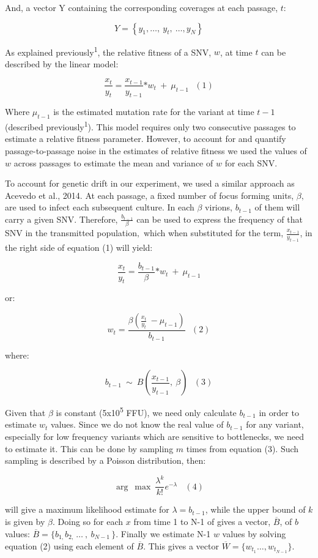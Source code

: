 \documentclass[
]{article}
\begin{document}
And, a vector Y containing the corresponding coverages at each passage,
\(t\):

\[Y = \left\{ y_{1},\ldots,\ y_{t},\ \ldots,y_{N} \right\}\]

As explained previously\textsuperscript{1}, the relative fitness of a
SNV, \(w\), at time \(t\) can be described by the linear model:

\[\frac{x_{t}}{y_{t}} = \frac{x_{t - 1}}{y_{t - 1}}{*w}_{t}\  + \ \mu_{t - 1}\ \ \ (1)\]

Where \(\mu_{t - 1}\) is the estimated mutation rate for the variant at
time \(t - 1\) (described previously\textsuperscript{1}). This model
requires only two consecutive passages to estimate a relative fitness
parameter. However, to account for and quantify passage-to-passage noise
in the estimates of relative fitness we used the values of \(w\) across
passages to estimate the mean and variance of \(w\) for each SNV.

To account for genetic drift in our experiment, we used a similar
approach as Acevedo et al., 2014. At each passage, a fixed number of
focus forming units, \(\beta,\) are used to infect each subsequent
culture. In each \(\beta\) virions, \(b_{t - 1}\) of them will carry a
given SNV. Therefore, \(\frac{b_{t - 1}}{\beta}\) can be used to express
the frequency of that SNV in the transmitted population\(,\) which when
substituted for the term, \(\frac{x_{t - 1}}{y_{t - 1}}\), in the right
side of equation (1) will yield:

\[\frac{x_{t}}{y_{t}} = \frac{b_{t - 1}}{\beta}{*w}_{t}\  + \ \mu_{t - 1}\]

or:

\[w_{t} = \frac{\beta(\frac{x_{t}}{y_{t}}\  - \mu_{t - 1})}{b_{t - 1}}\ \ \ (2)\]

where:

\[b_{t - 1}\ \sim\ B(\frac{x_{t - 1}}{y_{t - 1}},\ \beta)\ \ \ (3)\]

Given that \(\beta\) is constant (5x10\textsuperscript{5} FFU), we need
only calculate \(b_{t - 1}\) in order to estimate \(w_{t}\) values.
Since we do not know the real value of \(b_{t - 1}\) for any variant,
especially for low frequency variants which are sensitive to
bottlenecks, we need to estimate it. This can be done by sampling \(m\)
times from equation (3). Such sampling is described by a Poisson
distribution, then:

\[\arg\ \max\ \frac{\lambda^{k}}{k!}e^{- \lambda}\ \ \ \ (4)\]

will give a maximum likelihood estimate for \(\lambda{= b}_{t - 1}\),
while the upper bound of \(k\) is given by \(\beta\). Doing so for each
\(x\) from time 1 to N-1 of gives a vector, \(\overline{B}\), of \(b\)
values: \(\overline{B} = \{ b_{1,}b_{2,\ }\ldots\ ,\ b_{N - 1\ }\}\).
Finally we estimate N-1 \(w\) values by solving equation (2) using each
element of \(\overline{B}\). This gives a vector
\(\overline{W} = \{ w_{t_{1}}\ldots,w_{t_{N - 1}}\}\).
\end{document}
